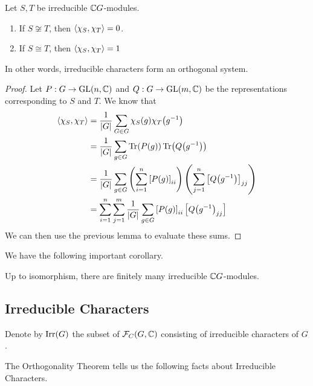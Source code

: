 \begin{boxtheorem} \label{Ch2:Thm:Orth_Char}
    Let $S, T$ be irreducible $\mathbb{C} G$-modules.
    \begin{enumerate}[label = \normalfont \arabic*., noitemsep]
        \item If $S \not\cong T$, then $\left\langle \chi_S, \chi_T \right\rangle = 0$.
        \item If $S \cong T$, then $\left\langle \chi_S, \chi_T \right\rangle = 1$
    \end{enumerate}
    In other words, irreducible characters form an orthogonal system.
\end{boxtheorem}
\begin{proof}
    Let $P : G \to \operatorname{GL}\!\left( n, \mathbb{C} \right)$ and $Q : G \to \operatorname{GL}\!\left( m, \mathbb{C} \right)$ be the representations corresponding to $S$ and $T$. We know that
    \begin{align*}
        \left\langle \chi_S, \chi_T \right\rangle &=
        \frac{1}{\left\lvert G \right\rvert} \sum_{G \in G} \chi_S(g) \chi_T\!\left( g^{-1} \right) \\
        &= \frac{1}{\left\lvert G \right\rvert} \sum_{g \in G} \operatorname{Tr}\!\left( P(g) \right) \operatorname{Tr}\!\left( Q\!\left( g^{-1} \right) \right) \\
        &= \frac{1}{\left\lvert G \right\rvert} \sum_{g \in G} \left( \sum_{i = 1}^{n} \left[ P(g) \right]_{ii} \right)\left( \sum_{j=1}^{n} \left[ Q\!\left( g^{-1} \right) \right]_{jj} \right) \\
        &= \sum_{i=1}^{n} \sum_{j=1}^{m} \frac{1}{\left\lvert G \right\rvert} \sum_{g \in G} \left[ P(g) \right]_{ii} \left[ Q\!\left( g^{-1} \right)_{jj} \right]
    \end{align*}
    We can then use the previous lemma to evaluate these sums.
\end{proof}

We have the following important corollary.

\begin{corollary}
    Up to isomorphism, there are finitely many irreducible $\mathbb{C} G$-modules.
\end{corollary}

\subsection{Irreducible Characters}

\begin{boxnotation}
    Denote by $\operatorname{Irr}\!\left( G \right)$ the subset of $\mathcal{F}_C\!\left( G, \mathbb{C} \right)$ consisting of irreducible characters of $G$.
\end{boxnotation}

The Orthogonality Theorem tells us the following facts about Irreducible Characters.

